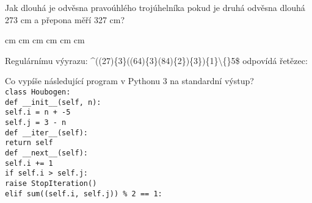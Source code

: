 \documentclass[addpoints,12pt]{exam}
\begin{document}
\begin{questions}
\nopagebreak
\makeemptybox{10cm}
\question[2]
Jak dlouhá je odvěsna pravoúhlého trojúhelníka pokud je druhá odvěsna dlouhá 273 cm a přepona měří 327 cm?
\nopagebreak
\begin{choices}
 cm
 cm
 cm
 cm
 cm
 cm
\end{choices}
\question[2]
Regulárnímu výyrazu: \^{}((27)\{3\}((64)\{3\}(84)\{2\})\{3\})\{1\}\textbackslash\{\}5\${} odpovídá řetězec:
\nopagebreak
\begin{choices}
\end{choices}
\question[2]
Co vypíše následující program v Pythonu 3 na standardní výstup?\\
\texttt{class Houbogen:\\
\hspace*{0.6cm}def \_{}\_{}init\_{}\_{}(self, n):\\
\hspace*{0.6cm}\hspace*{0.6cm}self.i = n + -5\\
\hspace*{0.6cm}\hspace*{0.6cm}self.j = 3 - n\\
\hspace*{0.6cm}def \_{}\_{}iter\_{}\_{}(self):\\
\hspace*{0.6cm}\hspace*{0.6cm}return self\\
\hspace*{0.6cm}def \_{}\_{}next\_{}\_{}(self):\\
\hspace*{0.6cm}\hspace*{0.6cm}self.i += 1\\
\hspace*{0.6cm}\hspace*{0.6cm}if self.i \textgreater{} self.j:\\
\hspace*{0.6cm}\hspace*{0.6cm}\hspace*{0.6cm}raise StopIteration()\\
\hspace*{0.6cm}\hspace*{0.6cm}elif sum((self.i, self.j)) \%{} 2 == 1:\\
}
\end{questions}
\end{document}
